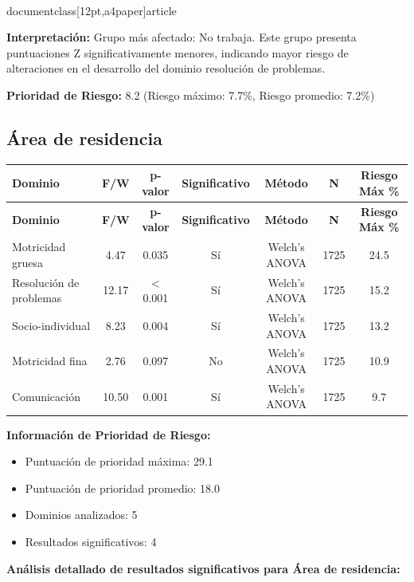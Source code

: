 \\documentclass[12pt,a4paper]{article}
\begin{document}
\textbf{Interpretación:} Grupo más afectado: No trabaja. Este grupo presenta puntuaciones Z significativamente menores, indicando mayor riesgo de alteraciones en el desarrollo del dominio resolución de problemas.

\textbf{Prioridad de Riesgo:} 8.2 (Riesgo máximo: 7.7\%, Riesgo promedio: 7.2\%)


\vspace{0.5cm}


\subsection{Área de residencia}


\begin{longtable}{|l|c|c|c|c|c|c|}
\hline
\textbf{Dominio} & \textbf{F/W} & \textbf{p-valor} & \textbf{Significativo} & \textbf{Método} & \textbf{N} & \textbf{Riesgo Máx \%} \\
\hline
\endfirsthead

\hline
\textbf{Dominio} & \textbf{F/W} & \textbf{p-valor} & \textbf{Significativo} & \textbf{Método} & \textbf{N} & \textbf{Riesgo Máx \%} \\
\hline
\endhead

\hline
\endfoot

\hline
\endlastfoot

Motricidad gruesa & 4.47 & 0.035 & Sí & Welch's ANOVA & 1725 & 24.5 \\
Resolución de problemas & 12.17 & < 0.001 & Sí & Welch's ANOVA & 1725 & 15.2 \\
Socio-individual & 8.23 & 0.004 & Sí & Welch's ANOVA & 1725 & 13.2 \\
Motricidad fina & 2.76 & 0.097 & No & Welch's ANOVA & 1725 & 10.9 \\
Comunicación & 10.50 & 0.001 & Sí & Welch's ANOVA & 1725 & 9.7 \\

\end{longtable}


\textbf{Información de Prioridad de Riesgo:}
\begin{itemize}
\item Puntuación de prioridad máxima: 29.1
\item Puntuación de prioridad promedio: 18.0
\item Dominios analizados: 5
\item Resultados significativos: 4
\end{itemize}


\textbf{Análisis detallado de resultados significativos para Área de residencia:}
\end{document}
